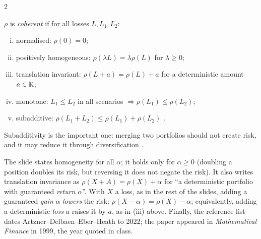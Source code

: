 \begin{paracol}{2}
\begin{definition}\label{ch08:def-coherent}
$\rho$ is \emph{coherent} if for all losses $L,L_1,L_2$:
\begin{enumerate}[(i)]
  \item normalised: $\rho(0)=0$;
  \item positively homogeneous: $\rho(\lambda L)=\lambda\rho(L)$ for $\lambda\ge0$;
  \item translation invariant: $\rho(L+a)=\rho(L)+a$ for a deterministic amount $a\in\mathbb{R}$;
  \item monotone: $L_1\le L_2$ in all scenarios $\Rightarrow\rho(L_1)\le\rho(L_2)$;
  \item subadditive: $\rho(L_1+L_2)\le\rho(L_1)+\rho(L_2)$ .
\end{enumerate}
\end{definition}
Subadditivity is the important one: merging two portfolios should not create risk, and it may reduce it through
diversification .

\begin{coursenote}
The slide states homogeneity for all $\alpha$; it holds only for $\alpha\ge0$ (doubling a position doubles its
risk, but reversing it does not negate the risk). It also writes translation invariance as
$\rho(X+A)=\rho(X)+\alpha$ for ``a deterministic portfolio with guaranteed \emph{return} $\alpha$''. With $X$ a loss,
as in the rest of the slides, adding a guaranteed \emph{gain} $\alpha$ \emph{lowers} the risk:
$\rho(X-\alpha)=\rho(X)-\alpha$; equivalently, adding a deterministic \emph{loss} $a$ raises it by $a$, as in
(iii) above. Finally, the reference list dates Artzner--Delbaen--Eber--Heath to 2022; the paper appeared in
\emph{Mathematical Finance} in 1999, the year quoted in class.
\end{coursenote}


\end{paracol}
